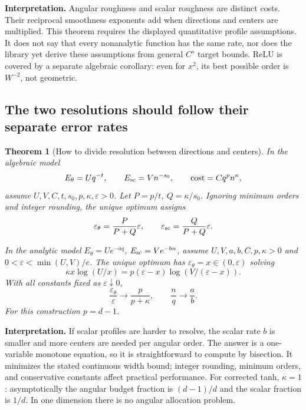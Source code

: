 \documentclass[11pt,letterpaper]{article}
\newcommand{\eps}{\varepsilon}
\newtheorem{theorem}{Theorem}
\theoremstyle{definition}
\theoremstyle{remark}
\begin{document}
\textbf{Interpretation.} Angular roughness and scalar roughness are distinct
costs. Their reciprocal smoothness exponents add when directions and centers
are multiplied. This theorem requires the displayed quantitative profile
assumptions. It does not say that every nonanalytic function has the same
rate, nor does the library yet derive these assumptions from general
\(C^s\) target bounds. ReLU is covered by a separate algebraic corollary:
even for \(x^2\), its best possible order is \(W^{-2}\), not geometric.

\subsection{The two resolutions should follow their separate error rates}
\begin{theorem}[How to divide resolution between directions and centers]\label{thm:split}
In the algebraic model
\[
 E_\theta=Uq^{-t},\qquad E_{\rm sc}=Vn^{-s_0},\qquad
 \text{cost}=Cq^p n^\kappa,
\]
assume \(U,V,C,t,s_0,p,\kappa,\eps>0\).
Let \(P=p/t\), \(Q=\kappa/s_0\). Ignoring minimum orders and integer rounding,
the unique optimum assigns
\[
 \eps_\theta=\frac{P}{P+Q}\eps,\qquad
 \eps_{\rm sc}=\frac{Q}{P+Q}\eps.
\]

In the analytic model \(E_\theta=Ue^{-aq}\), \(E_{\rm sc}=Ve^{-bn}\),
assume \(U,V,a,b,C,p,\kappa>0\) and
\(0<\eps<\min(U,V)/e\).
The unique optimum has \(\eps_\theta=x\in(0,\eps)\) solving
\begin{equation}\label{eq:balance}
 \kappa x\log(U/x)
   =p(\eps-x)\log(V/(\eps-x)).
\end{equation}
With all constants fixed as \(\eps\downarrow0\),
\[
 \frac{\eps_\theta}{\eps}\longrightarrow\frac{p}{p+\kappa},
 \qquad
 \frac{n}{q}\longrightarrow\frac{a}{b}.
\]
For this construction \(p=d-1\).
\end{theorem}
\textbf{Interpretation.} If scalar profiles are harder to resolve, the scalar
rate \(b\) is smaller and more centers are needed per angular order.
The answer is a one-variable monotone equation, so it is straightforward to
compute by bisection. It minimizes the stated continuous width bound;
integer rounding, minimum orders, and conservative constants affect practical
performance.
For corrected tanh, \(\kappa=1\): asymptotically the angular budget fraction
is \((d-1)/d\) and the scalar fraction is \(1/d\). In one dimension there is no angular
allocation problem.
\end{document}
